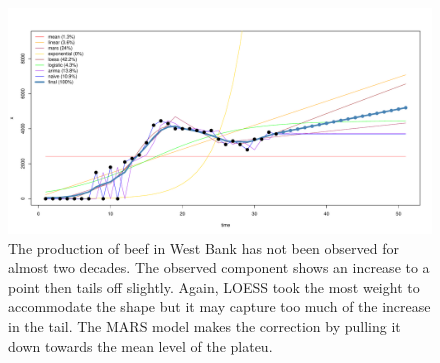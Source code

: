 \documentclass[nojss]{jss}\usepackage[]{graphicx}\usepackage[]{color}
\makeatletter
\def\maxwidth{ %
  \ifdim\Gin@nat@width>\linewidth
    \linewidth
  \else
    \Gin@nat@width
  \fi
}
\newenvironment{knitrout}{}{} %
\makeatother
\begin{document}
\begin{knitrout}
\color{fgcolor}\begin{figure}[!ht]


{\centering \includegraphics[width=\maxwidth]{figure/beef-westbank} 

}

\caption[The production of beef in West Bank has not been observed for almost two decades]{The production of beef in West Bank has not been observed for almost two decades. The observed component shows an increase to a point then tails off slightly. Again, LOESS took the most weight to accommodate the shape but it may capture too much of the increase in the tail. The MARS model makes the correction by pulling it down towards the mean level of the plateu.\label{fig:beef-westbank}}
\end{figure}


\end{knitrout}
\end{document}
